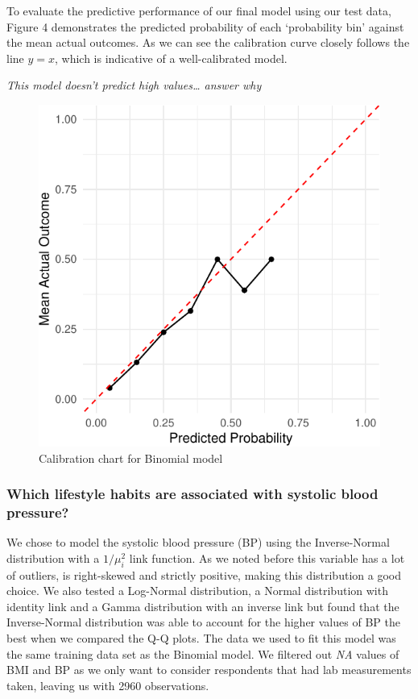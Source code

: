 \documentclass[
  11pt,
  twocolumn]{article}
\begin{document}
To evaluate the predictive performance of our final model using our test
data, Figure 4 demonstrates the predicted probability of each
`probability bin' against the mean actual outcomes. As we can see the
calibration curve closely follows the line \(y = x\), which is
indicative of a well-calibrated model.

\emph{This model doesn't predict high values\ldots{} answer why}

\begin{figure}[H]

{\centering \includegraphics{Coursework_files/figure-latex/output-calibration-chart-1} 

}

\caption{Calibration chart for Binomial model}\label{fig:output-calibration-chart}
\end{figure}

\subsubsection{Which lifestyle habits are associated with systolic blood
pressure?}\label{which-lifestyle-habits-are-associated-with-systolic-blood-pressure}

We chose to model the systolic blood pressure (BP) using the
Inverse-Normal distribution with a \(1/\mu_i^2\) link function. As we
noted before this variable has a lot of outliers, is right-skewed and
strictly positive, making this distribution a good choice. We also
tested a Log-Normal distribution, a Normal distribution with identity
link and a Gamma distribution with an inverse link but found that the
Inverse-Normal distribution was able to account for the higher values of
BP the best when we compared the Q-Q plots. The data we used to fit this
model was the same training data set as the Binomial model. We filtered
out \emph{NA} values of BMI and BP as we only want to consider
respondents that had lab measurements taken, leaving us with 2960
observations.
\end{document}
